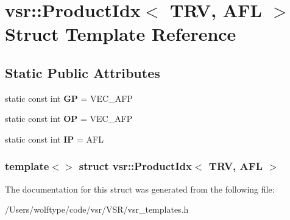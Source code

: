 \hypertarget{structvsr_1_1_product_idx_3_01_t_r_v_00_01_a_f_l_01_4}{\section{vsr\-:\-:Product\-Idx$<$ T\-R\-V, A\-F\-L $>$ Struct Template Reference}
\label{structvsr_1_1_product_idx_3_01_t_r_v_00_01_a_f_l_01_4}
}
\subsection*{Static Public Attributes}
\begin{DoxyCompactItemize}
\item 
\hypertarget{structvsr_1_1_product_idx_3_01_t_r_v_00_01_a_f_l_01_4_a29a2cc1de49c6af7f697d7d4ad93b97f}{static const int {\bfseries G\-P} = V\-E\-C\-\_\-\-A\-F\-P}\label{structvsr_1_1_product_idx_3_01_t_r_v_00_01_a_f_l_01_4_a29a2cc1de49c6af7f697d7d4ad93b97f}

\item 
\hypertarget{structvsr_1_1_product_idx_3_01_t_r_v_00_01_a_f_l_01_4_ad37a334c938a466ec1554c19d2747178}{static const int {\bfseries O\-P} = V\-E\-C\-\_\-\-A\-F\-P}\label{structvsr_1_1_product_idx_3_01_t_r_v_00_01_a_f_l_01_4_ad37a334c938a466ec1554c19d2747178}

\item 
\hypertarget{structvsr_1_1_product_idx_3_01_t_r_v_00_01_a_f_l_01_4_a271147c7dde8328cd09aae130f9bb195}{static const int {\bfseries I\-P} = A\-F\-L}\label{structvsr_1_1_product_idx_3_01_t_r_v_00_01_a_f_l_01_4_a271147c7dde8328cd09aae130f9bb195}

\end{DoxyCompactItemize}
\subsubsection*{template$<$$>$ struct vsr\-::\-Product\-Idx$<$ T\-R\-V, A\-F\-L $>$}



The documentation for this struct was generated from the following file\-:\begin{DoxyCompactItemize}
\item 
/\-Users/wolftype/code/vsr/\-V\-S\-R/vsr\-\_\-templates.\-h\end{DoxyCompactItemize}
